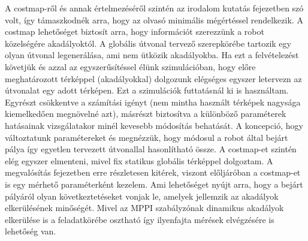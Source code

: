 A costmap-ről és annak értelmezéséről szintén az irodalom kutatás fejezetben szó volt, így támaszkodnék arra, hogy az olvasó minimális mégértéssel rendelkezik. A costmap lehetőséget biztosít arra, hogy információt szerezzünk a robot közelségére akadályoktól. A globális útvonal tervező szerepkörébe tartozik egy olyan útvonal legenerálása, ami nem ütközik akadályokba. Ha ezt a felvételezést követjük és azzal az egyszerűsítéssel élünk szimulációban, hogy előre meghatározott térképpel (akadályokkal) dolgozunk elégséges egyszer letervezn az útvonalat egy adott térképen. Ezt a szimulációk futtatásnál ki is használtam. Egyrészt csökkentve a számítási igényt (nem mintha használt térképek nagysága kiemelkedően megnövelné azt), másrészt biztosítva a különböző paraméterek hatásainak vizsgálatakor minél kevesebb módosítás behatását. A koncepció, hogy változtatunk paramétereket és megnézzük, hogy módosul a robot által bejárt pálya így egyetlen tervezett útvonallal hasonlítható össze. A costmap-et szintén elég egyszer elmenteni, mivel fix statikus globális térképpel dolgoztam. A megvalósítás fejezetben erre részletesen kitérek, viszont előljáróban a costmap-et is egy mérhető paraméterként kezelem. Ami lehetőséget nyújt arra, hogy a bejárt pályáról olyan következtetéseket vonjak le, amelyek jellemzik az akadályok elkerülésének minőségét. Mivel az MPPI szabályzónak dinamikus akadályok elkerülése is a feladatkörébe osztható így ilyenfajta mérések elvégzésére is lehetőség van.

